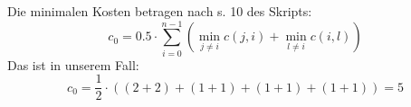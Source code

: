 \documentclass[10pt,a4paper]{article}
\begin{document}
\begin{enumerate}[label={\alph*)}]
\begin{figure}[H]
            \end{figure}
            Die minimalen Kosten betragen nach s. 10 des Skripts:
            $$
                c_0 = 0.5 \cdot \sum_{i=0}^{n-1}
                \left( \min\limits_{j \neq i} c(j,i) +
                \min\limits_{l \neq i} c(i,l) \right)
            $$
            Das ist in unserem Fall:
            $$
                c_0 = \frac{1}{2} \cdot
                    ((2+2)+(1+1)+(1+1)+(1+1))
                    = 5
            $$
            \begin{figure}[H]
                \centering
                \def\svgwidth{\columnwidth}
            \end{figure}

    \end{enumerate}
\end{document}
